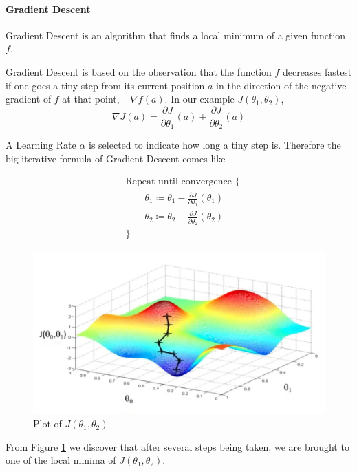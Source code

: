 \documentclass[12pt, twoside]{article}
\begin{document}
\begin{multicols*}{2}
			\paragraph{Gradient Descent}
			Gradient Descent is an algorithm that finds a local minimum of a given function $f$.
			
			Gradient Descent is based on the observation that the function $f$ decreases fastest if one goes a tiny step from its current position $a$ in the direction of the negative gradient of $f$ at that point, $-\nabla f(a)$.\cite{enwiki:1187716577} In our example $J(\theta_1,\theta_2)$,
			$$ \nabla J(a)=\frac{\partial J}{\partial\theta_1}(a)+\frac{\partial J}{\partial\theta_2}(a) $$
			
			A Learning Rate $\alpha$ is selected to indicate how long a tiny step is. Therefore the big iterative formula of Gradient Descent comes like
			
			\begin{align*}
				&\text{Repeat until convergence \{}\\
					&\qquad\theta_1\coloneq\theta_1-\frac{\partial J}{\partial\theta_1}(\theta_1)\\
					&\qquad\theta_2\coloneq\theta_2-\frac{\partial J}{\partial\theta_2}(\theta_2)\\
				&\text{\}}
			\end{align*}
			
			\begin{figure}[H]
				\centering
				\includegraphics[width=\columnwidth]{gradient-descent-local-global-minimum}
				\caption{Plot of $J(\theta_1,\theta_2)$}
				\label{fig:GDplot1}
			\end{figure}
			
			From Figure \ref{fig:GDplot1} we discover that after several steps being taken, we are brought to one of the local minima of $J(\theta_1,\theta_2)$.
			

\end{multicols*}
\end{document}
